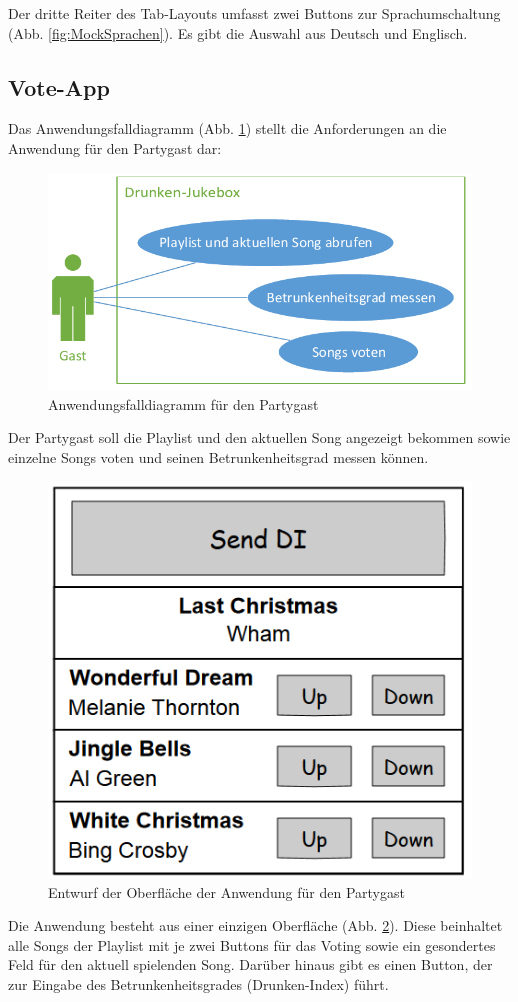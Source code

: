 Der dritte Reiter des Tab-Layouts umfasst zwei Buttons zur Sprachumschaltung (Abb. \ref{fig:MockSprachen}). Es gibt die Auswahl aus Deutsch und Englisch.

\subsection{Vote-App}
Das Anwendungsfalldiagramm (Abb. \ref{fig:PartyPeopleUseCase}) stellt die Anforderungen an die Anwendung für den Partygast dar:

\begin{figure}[H]
\centering
\includegraphics[width=0.8\linewidth]{Bilder/PartyPeopleUseCase}
\caption{Anwendungsfalldiagramm für den Partygast}
\label{fig:PartyPeopleUseCase}
\end{figure}

Der Partygast soll die Playlist und den aktuellen Song angezeigt bekommen sowie einzelne Songs voten und seinen Betrunkenheitsgrad messen können.

\begin{figure}[H]
\centering
\includegraphics[width=0.45\linewidth]{Bilder/MockPartyPeopleClient}
\caption{Entwurf der Oberfläche der Anwendung für den Partygast}
\label{fig:MockPartyPeopleClient}
\end{figure}

Die Anwendung besteht aus einer einzigen Oberfläche (Abb. \ref{fig:MockPartyPeopleClient}). Diese beinhaltet alle Songs der Playlist mit je zwei Buttons für das Voting sowie ein gesondertes Feld für den aktuell spielenden Song. Darüber hinaus gibt es einen Button, der zur Eingabe des Betrunkenheitsgrades (Drunken-Index) führt.

